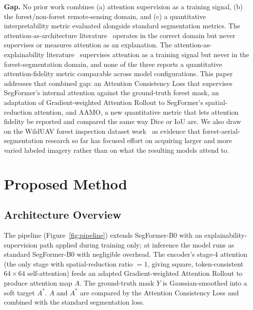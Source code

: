 \documentclass[sigconf,review]{acmart}
\begin{document}
\textbf{Gap.} No prior work combines (a) attention supervision as a
training signal, (b) the forest/non-forest remote-sensing domain, and (c) a
quantitative interpretability metric evaluated alongside standard
segmentation metrics. The attention-as-architecture
literature~\cite{foresanext2026,ppliteseg2026,attunet2022deforestation}
operates in the correct domain but never supervises or measures attention
as an explanation. The attention-as-explainability
literature~\cite{zhang2023exvit,chen2022transattunet,guiding2024driving}
supervises attention as a training signal but never in the
forest-segmentation domain, and none of the three reports a quantitative
attention-fidelity metric comparable across model configurations. This
paper addresses that combined gap: an Attention Consistency Loss that
supervises SegFormer's internal attention against the ground-truth forest
mask, an adaptation of Gradient-weighted Attention Rollout to SegFormer's
spatial-reduction attention, and AAMO, a new quantitative metric that lets
attention fidelity be reported and compared the same way Dice or IoU are.
We also draw on the WildUAV forest inspection dataset
work~\cite{blaga2024wilduav} as evidence that forest-aerial-segmentation
research so far has focused effort on acquiring larger and more varied
labeled imagery rather than on what the resulting models attend to.

\section{Proposed Method}

\subsection{Architecture Overview}
The pipeline (Figure~\ref{fig:pipeline}) extends SegFormer-B0 with an
explainability-supervision path applied during training only; at inference
the model runs as standard SegFormer-B0 with negligible overhead. The
encoder's stage-4 attention (the only stage with spatial-reduction ratio
$=1$, giving square, token-consistent $64\times64$ self-attention) feeds an
adapted Gradient-weighted Attention Rollout to produce attention map $A$.
The ground-truth mask $Y$ is Gaussian-smoothed into a soft target $A^{*}$.
$A$ and $A^{*}$ are compared by the Attention Consistency Loss and combined
with the standard segmentation loss.
\end{document}

